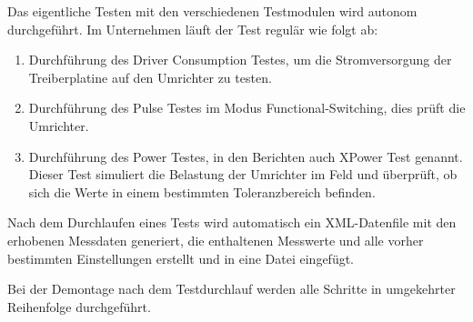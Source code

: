 Das eigentliche Testen mit den verschiedenen Testmodulen wird autonom durchgeführt.
Im Unternehmen läuft der Test regulär wie folgt ab:
\begin{enumerate}

\item Durchführung des Driver Consumption Testes, um die Stromversorgung der Treiberplatine auf den Umrichter zu testen.
\item Durchführung des Pulse Testes im Modus Functional-Switching, dies prüft die Umrichter.
\item Durchführung des Power Testes, in den Berichten auch XPower Test genannt.
Dieser Test simuliert die Belastung der Umrichter im Feld und überprüft,
ob sich die Werte in einem bestimmten Toleranzbereich befinden.

\end{enumerate}

Nach dem Durchlaufen eines Tests wird automatisch ein XML-Datenfile mit den erhobenen Messdaten generiert,
die enthaltenen Messwerte und alle vorher bestimmten Einstellungen erstellt und in eine Datei eingefügt.

Bei der Demontage nach dem Testdurchlauf werden alle Schritte in umgekehrter Reihenfolge durchgeführt.





